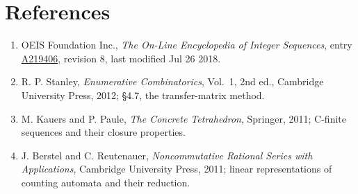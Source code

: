 \documentclass[11pt]{article}
\theoremstyle{definition}
\begin{document}
\section{References}

\begin{enumerate}

\item OEIS Foundation Inc., \emph{The On-Line Encyclopedia of Integer Sequences}, entry \href{https://oeis.org/A219406}{A219406}, revision 8, last modified Jul 26 2018.

\item R. P. Stanley, \emph{Enumerative Combinatorics}, Vol.~1, 2nd ed., Cambridge University Press, 2012; \S4.7, the transfer-matrix method.

\item M. Kauers and P. Paule, \emph{The Concrete Tetrahedron}, Springer, 2011; C-finite sequences and their closure properties.

\item J. Berstel and C. Reutenauer, \emph{Noncommutative Rational Series with Applications}, Cambridge University Press, 2011; linear representations of counting automata and their reduction.

\end{enumerate}
\end{document}
